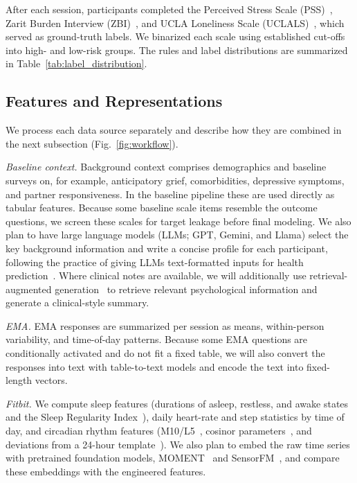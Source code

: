 \documentclass[letterpaper, 10 pt, conference]{ieeeconf}  %
\begin{document}
After each session, participants completed the Perceived Stress Scale (PSS)~\cite{cohen1983}, Zarit Burden Interview (ZBI)~\cite{gratao2019}, and UCLA Loneliness Scale (UCLALS)~\cite{russell1996}, which served as ground-truth labels. We binarized each scale using established cut-offs into high- and low-risk groups. The rules and label distributions are summarized in Table~\ref{tab:label_distribution}.


\subsection{Features and Representations}
We process each data source separately and describe how they are combined in the next subsection (Fig.~\ref{fig:workflow}).

\textit{Baseline context.} Background context comprises demographics and baseline surveys on, for example, anticipatory grief, comorbidities, depressive symptoms, and partner responsiveness. In the baseline pipeline these are used directly as tabular features. Because some baseline scale items resemble the outcome questions, we screen these scales for target leakage before final modeling. We also plan to have large language models (LLMs; GPT, Gemini, and Llama) select the key background information and write a concise profile for each participant, following the practice of giving LLMs text-formatted inputs for health prediction~\cite{kim2024healthllm}. Where clinical notes are available, we will additionally use retrieval-augmented generation~\cite{lewis2020rag} to retrieve relevant psychological information and generate a clinical-style summary. %

\textit{EMA.} EMA responses are summarized per session as means, within-person variability, and time-of-day patterns. Because some EMA questions are conditionally activated and do not fit a fixed table, we will also convert the responses into text with table-to-text models and encode the text into fixed-length vectors. %

\textit{Fitbit.} We compute sleep features (durations of asleep, restless, and awake states and the Sleep Regularity Index~\cite{fischer2021sri}), daily heart-rate and step statistics by time of day, and circadian rhythm features (M10/L5~\cite{goncalves2014}, cosinor parameters~\cite{cornelissen2014}, and deviations from a 24-hour template~\cite{tseng2020}). We also plan to embed the raw time series with pretrained foundation models, MOMENT~\cite{goswami2024moment} and SensorFM~\cite{sensorfm2026}, and compare these embeddings with the engineered features.
\end{document}
